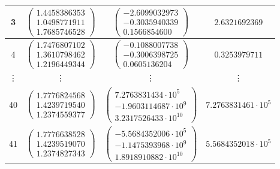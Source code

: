 \documentclass{article}
\begin{document}
\begin{table}[htb]
\begin{tabular}{|c|c|c|c|}
        3      & $\begin{pmatrix} 1.4458386353   \\ 1.0498771911   \\ 1.7685746528   \end{pmatrix}$ & $\begin{pmatrix} -2.6099032973              \\ -0.3035940339              \\ 0.1566854600               \end{pmatrix}$ & $ 2.6321692369 $              \\ \hline
        4      & $\begin{pmatrix} 1.7476807102   \\ 1.3610798462   \\ 1.2196449344   \end{pmatrix}$ & $\begin{pmatrix} -0.1088007738              \\ -0.3006398725              \\ 0.0605136204               \end{pmatrix}$ & $ 0.3253979711 $              \\ \hline
        \vdots & \vdots                                                                             & \vdots                                                                                                                 & \vdots                        \\ \hline
        40     & $\begin{pmatrix} 1.7776824568   \\ 1.4239719540   \\ 1.2374559377   \end{pmatrix}$ & $\begin{pmatrix} 7.2763831434\cdot 10^{5}   \\ -1.9603114687\cdot 10^{9}  \\ 3.2317526433\cdot 10^{10}  \end{pmatrix}$ & $ 7.2763831461\cdot 10^{5}$   \\ \hline
        41     & $\begin{pmatrix} 1.7776638528   \\ 1.4239519070   \\ 1.2374827343   \end{pmatrix}$ & $\begin{pmatrix} -5.5684352006\cdot 10^{5}  \\ -1.1475393968\cdot 10^{9}  \\ 1.8918910882\cdot 10^{10}  \end{pmatrix}$ & $ 5.5684352018\cdot 10^{5}$   \\ \hline

\end{tabular}
\end{table}
\end{document}
